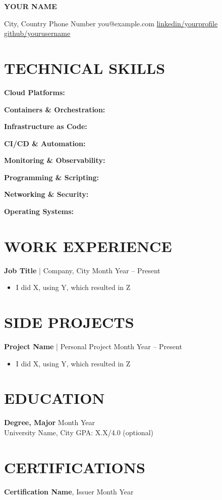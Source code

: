 \documentclass[11pt,letterpaper]{article}
\begin{document}
{\centering \huge \textbf{YOUR NAME}\par}
\vspace{1pt}
{\centering \small City, Country \textbar{} Phone Number \textbar{} you@example.com \textbar{} \href{https://linkedin.com/in/yourprofile}{linkedin/yourprofile} \textbar{} \href{https://github.com/yourusername}{github/yourusername}\par}

\vspace{1pt}

\section*{TECHNICAL SKILLS}

\textbf{Cloud Platforms:}

\textbf{Containers \& Orchestration:}

\textbf{Infrastructure as Code:}

\textbf{CI/CD \& Automation:}

\textbf{Monitoring \& Observability:}

\textbf{Programming \& Scripting:}

\textbf{Networking \& Security:}

\textbf{Operating Systems:}

\vspace{1pt}

\section*{WORK EXPERIENCE}
\textbf{Job Title} | Company, City \hfill Month Year -- Present
\begin{itemize}[leftmargin=*,noitemsep,topsep=1pt]
    \item I did X, using Y, which resulted in Z
\end{itemize}

\vspace{1pt}

\section*{SIDE PROJECTS}
\textbf{Project Name} | Personal Project \hfill Month Year -- Present
\begin{itemize}[leftmargin=*,noitemsep,topsep=1pt]
    \item I did X, using Y, which resulted in Z
\end{itemize}

\vspace{1pt}

\section*{EDUCATION}
\textbf{Degree, Major} \hfill Month Year\\
University Name, City \hfill GPA: X.X/4.0 (optional)

\vspace{1pt}

\section*{CERTIFICATIONS}
\textbf{Certification Name}, Issuer \hfill Month Year
\end{document}
